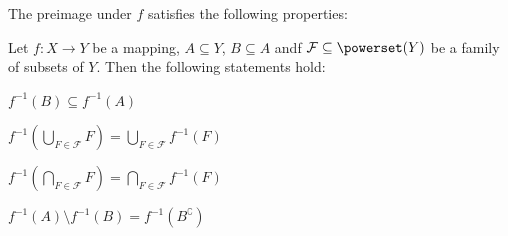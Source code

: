The preimage under $f$ satisfies the following properties:
\begin{theorem}\label{theorem:mappings:preimage_properties}
    Let $f\colon X\rightarrow Y$ be a mapping, $A\subseteq Y$, $B\subseteq A$ andf $\mathcal F\subseteq\powerset(Y)$ be a family of subsets of $Y$. Then the following statements hold:
    \begin{intheoremenumerate}
        \item $f^{-1}(B)\subseteq f^{-1}(A)$
        \item $f^{-1}(\bigcup_{F\in\mathcal F}F)=\bigcup_{F\in\mathcal F}f^{-1}(F)$
        \item $f^{-1}(\bigcap_{F\in\mathcal F}F)=\bigcap_{F\in\mathcal F}f^{-1}(F)$
        \item $f^{-1}(A)\setminus f^{-1}(B)=f^{-1}(B^\complement)$
    \end{intheoremenumerate}
\end{theorem}

